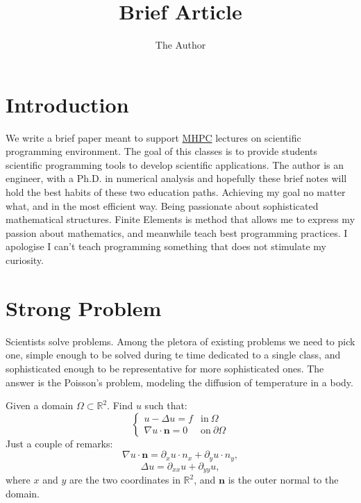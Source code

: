 \documentclass[11pt]{amsart}
\title{Brief Article}
\author{The Author}
\begin{document}
\maketitle

\section{Introduction}
We write a brief paper meant to support \href{http://www.mhpc.it/}{MHPC} 
lectures on scientific programming environment. The goal of this classes 
is to provide students scientific programming tools to develop scientific applications. 
The author is an engineer, with a Ph.D. in numerical analysis and hopefully these brief 
notes will hold the best habits of these two education paths. Achieving my goal no 
matter what, and in the most efficient way. Being passionate about sophisticated 
mathematical structures. Finite Elements is method that allows me to express my passion 
about mathematics, and meanwhile teach best programming practices. I apologise 
I can't teach programming something that does not stimulate my curiosity.

\section{Strong Problem}
Scientists solve problems. Among the pletora of existing problems 
we need to pick one, simple enough to be solved during te time dedicated to a single 
class, and sophisticated enough to be representative for more sophisticated ones. 
The answer is the Poisson's problem,
modeling the diffusion of temperature in a body.

Given a domain $\Omega\subset \mathbb{R}^2$.
Find $u$ such that:
\[
\left\{
\begin{array}{ll}
u -\Delta u = f & \mathrm{in}\ \Omega \\
\nabla u \cdot \mathbf{n} = 0  & \mathrm{on}\ \partial\Omega
\end{array}
\right.
\]
Just a couple of remarks:
\[
\nabla u \cdot \mathbf{n}  = \partial_{x} u \cdot n_x+ \partial_{y} u \cdot n_y,
\]
\[
\Delta u = \partial_{xx} u + \partial_{yy} u,
\]
where $x$ and $y$ are the two coordinates in $\mathbb{R}^2$, and $\mathbf{n}$ 
is the outer normal to the domain.
\end{document}
